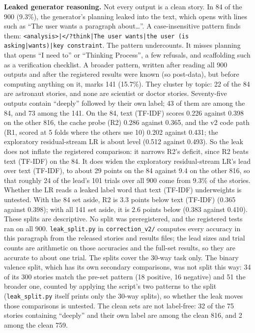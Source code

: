\documentclass[11pt,a4paper]{article}
\begin{document}
\textbf{Leaked generator reasoning.}\label{sec:leak} Not every output is a clean story. In 84 of the 900 (9.3\%), the generator's planning leaked into the text, which opens with lines such as ``The user wants a paragraph about\ldots''. A case-insensitive pattern finds them: \texttt{<analysis>|</?think|The user wants|the user (is asking|wants)|key constraint}. The pattern undercounts. It misses planning that opens ``I need to'' or ``Thinking Process'', a few refusals, and scaffolding such as a verification checklist. A broader pattern, written after reading all 900 outputs and after the registered results were known (so post-data), but before computing anything on it, marks 141 (15.7\%). They cluster by topic: 22 of the 84 are astronaut stories, and none are scientist or doctor stories. Seventy-five outputs contain ``deeply'' followed by their own label; 43 of them are among the 84, and 73 among the 141. On the 84, text (TF-IDF) scores 0.226 against 0.398 on the other 816, the cache probe (R2) 0.286 against 0.365, and the v2 code path (R1, scored at 5 folds where the others use 10) 0.202 against 0.431; the exploratory residual-stream LR is about level (0.512 against 0.493). So the leak does not inflate the registered comparison: it narrows R2's deficit, since R2 beats text (TF-IDF) on the 84. It does widen the exploratory residual-stream LR's lead over text (TF-IDF), to about 29 points on the 84 against 9.4 on the other 816, so that roughly 24 of the lead's 101 trials over all 900 come from 9.3\% of the stories. Whether the LR reads a leaked label word that text (TF-IDF) underweights is untested. With the 84 set aside, R2 is 3.3 points below text (TF-IDF) (0.365 against 0.398); with all 141 set aside, it is 2.6 points below (0.383 against 0.410). These splits are descriptive. No split was preregistered, and the registered tests ran on all 900. \texttt{leak\_split.py} in \texttt{correction\_v2/} computes every accuracy in this paragraph from the released stories and results files; the lead sizes and trial counts are arithmetic on those accuracies and the full-set results, so they are accurate to about one trial. The splits cover the 30-way task only. The binary valence split, which has its own secondary comparisons, was not split this way: 34 of its 300 stories match the pre-set pattern (18 positive, 16 negative) and 51 the broader one, counted by applying the script's two patterns to the split (\texttt{leak\_split.py} itself prints only the 30-way splits), so whether the leak moves those comparisons is untested. The clean sets are not label-free: 32 of the 75 stories containing ``deeply'' and their own label are among the clean 816, and 2 among the clean 759.
\end{document}
